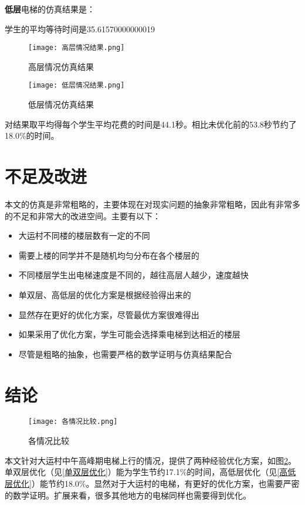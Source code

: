 \documentclass[letterpaper,12pt]{article}
\begin{document}
\textbf{低层}电梯的仿真结果是：
\begin{python}
学生的平均等待时间是35.61570000000019
\end{python}



\begin{figure}[H]
\begin{minipage}[t]{0.5\linewidth}
\centering
\texttt{[image: 高层情况结果.png]}
\caption{高层情况仿真结果}
\label{高层情况仿真结果}
\end{minipage}%
\begin{minipage}[t]{0.5\linewidth}
\centering
\texttt{[image: 低层情况结果.png]}
\caption{低层情况仿真结果}
\label{低层情况仿真结果}
\end{minipage}
\end{figure}
对结果取平均得每个学生平均花费的时间是44.1秒。相比未优化前的53.8秒节约了18.0\%的时间。

\section{不足及改进}
本文的仿真是非常粗略的，主要体现在对现实问题的抽象非常粗略，因此有非常多的不足和非常大的改进空间。主要有以下：
\begin{itemize}
    \item 大运村不同楼的楼层数有一定的不同
    \item 需要上楼的同学并不是随机均匀分布在各个楼层的
    \item 不同楼层学生出电梯速度是不同的，越往高层人越少，速度越快
    \item 单双层、高低层的优化方案是根据经验得出来的
    \item 显然存在更好的优化方案，尽管最优方案很难得出
    \item 如果采用了优化方案，学生可能会选择乘电梯到达相近的楼层
    \item 尽管是粗略的抽象，也需要严格的数学证明与仿真结果配合
\end{itemize}

\section{结论}
\begin{figure}[H]

\centering
\texttt{[image: 各情况比较.png]}
\caption{各情况比较}
\label{各情况比较}
 
\end{figure}
本文针对大运村中午高峰期电梯上行的情况，提供了两种经验优化方案，如图\ref{各情况比较}。单双层优化（见\ref{单双层优化}）能为学生节约17.1\%的时间，高低层优化（见\ref{高低层优化}）能节约18.0\%。显然对于大运村的电梯，有更好的优化方案，也需要严密的数学证明。扩展来看，很多其他地方的电梯同样也需要得到优化。
\end{document}

